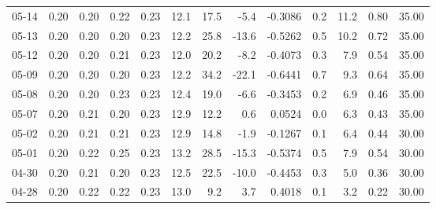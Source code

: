 \begin{threeparttable}
{\begin{tabular}{lrrrrrrrrrrrr}
  05-14 &          0.20 &          0.20 &          0.22 &        0.23 &                12.1 &                17.5 &       -5.4 &      -0.3086 &                 0.2 &             11.2 &            0.80 &                  35.00 \\
  05-13 &          0.20 &          0.20 &          0.20 &        0.23 &                12.2 &                25.8 &      -13.6 &      -0.5262 &                 0.5 &             10.2 &            0.72 &                  35.00 \\
  05-12 &          0.20 &          0.20 &          0.21 &        0.23 &                12.0 &                20.2 &       -8.2 &      -0.4073 &                 0.3 &              7.9 &            0.54 &                  35.00 \\
  05-09 &          0.20 &          0.20 &          0.20 &        0.23 &                12.2 &                34.2 &      -22.1 &      -0.6441 &                 0.7 &              9.3 &            0.64 &                  35.00 \\
  05-08 &          0.20 &          0.20 &          0.23 &        0.23 &                12.4 &                19.0 &       -6.6 &      -0.3453 &                 0.2 &              6.9 &            0.46 &                  35.00 \\
  05-07 &          0.20 &          0.21 &          0.20 &        0.23 &                12.9 &                12.2 &        0.6 &       0.0524 &                 0.0 &              6.3 &            0.43 &                  35.00 \\
  05-02 &          0.20 &          0.21 &          0.21 &        0.23 &                12.9 &                14.8 &       -1.9 &      -0.1267 &                 0.1 &              6.4 &            0.44 &                  30.00 \\
  05-01 &          0.20 &          0.22 &          0.25 &        0.23 &                13.2 &                28.5 &      -15.3 &      -0.5374 &                 0.5 &              7.9 &            0.54 &                  30.00 \\
  04-30 &          0.20 &          0.21 &          0.20 &        0.23 &                12.5 &                22.5 &      -10.0 &      -0.4453 &                 0.3 &              5.0 &            0.36 &                  30.00 \\
  04-28 &          0.20 &          0.22 &          0.22 &        0.23 &                13.0 &                 9.2 &        3.7 &       0.4018 &                 0.1 &              3.2 &            0.22 &                  30.00 \\

\end{tabular}}
\end{threeparttable}
